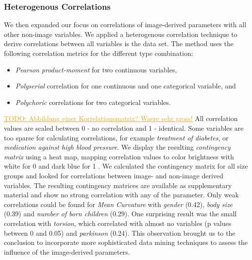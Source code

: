 \documentclass[a4paper,twoside]{style/article}
\newcommand{\com}[1]{\textcolor{orange}{\uline{#1}}}
\begin{document}
\subsubsection{Heterogenous Correlations}
We then expanded our focus on correlations of image-derived parameters with all other non-image variables.
We applied a heterogenous correlation technique to derive correlations between all variables is the data set.
The method uses the following correlation metrics for the different type combination:
\begin{itemize}
\item \emph{Pearson product-moment} for two continuous variables, 
\item \emph{Polyserial} correlation for one continuous and one categorical variable, and
\item \emph{Polychoric} correlations for two categorical variables.
\end{itemize}
\com{TODO: Abbildung einer Korrelationsmatrix? Waere sehr gross!}
All correlation values are scaled between 0 - no correlation and 1 - identical.
Some variables are too sparse for calculating correlations, for example \emph{treatment of diabetes}, or \emph{medication against high blood pressure}.
We display the resulting \emph{contingency matrix} using a heat map, mapping correlation values to color brightness with white for 0 and dark blue for 1 \cite{Klemm2014VIS}.
We calculated the contingency matrix for all size groups and looked for correlations between image- and non-image derived variables.
The resulting contingency matrices are available as supplementary material and show no strong correlation with any of the parameter.
Only weak correlations could be found for \emph{Mean Curvature} with \emph{gender} (0.42), \emph{body size} (0.39) and \emph{number of born children} (0.29).
One surprising result was the small correlation with \emph{torsion}, which correlated with almost no variables (p values between 0 and 0.05) and \emph{parkinson} (0.24).
This observation brought us to the conclusion to incorporate more sophisticated data mining techniques to assess the influence of the image-derived parameters.
\end{document}
